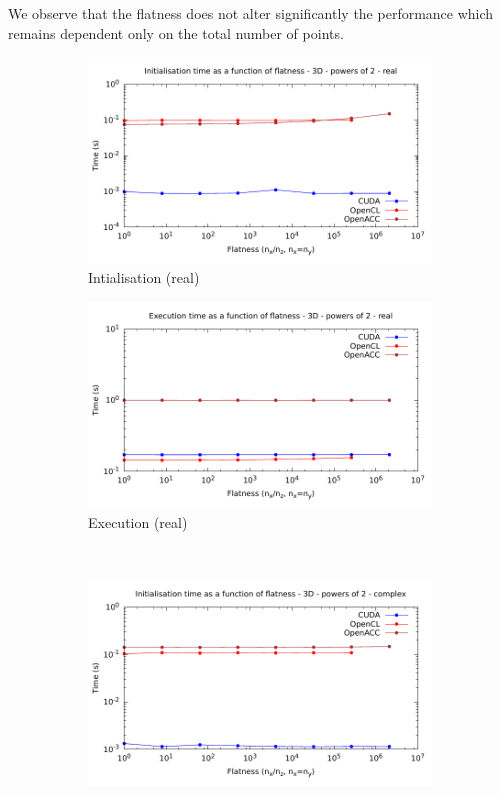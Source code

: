 \documentclass[12pt, a4paper]{article}
\begin{document}
We observe that the flatness does not alter significantly the performance which remains dependent only on the total number of points.

\begin{figure}[H]
\captionsetup{width=0.8\linewidth}
\centering
\begin{subfigure}{.5\textwidth}
\centering
\includegraphics[width=.9\linewidth]{graphs/flatness-r-init.pdf}
\caption{Intialisation (real)}
\label{FFT1DRI}
\end{subfigure}%
\begin{subfigure}{.5\textwidth}
\centering
\includegraphics[width=.9\linewidth]{graphs/flatness-r-exec.pdf}
\caption{Execution (real)}
\label{FFT1DRE}
\end{subfigure}\\
\begin{subfigure}{.5\textwidth}
\centering
\includegraphics[width=.9\linewidth]{graphs/flatness-c-init.pdf}

\end{subfigure}
\end{figure}
\end{document}
